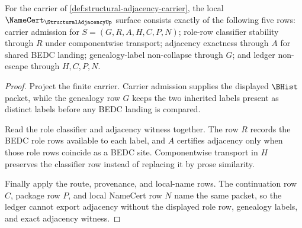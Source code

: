 \begin{theorem}
\label{thm:structural-adjacency-namecert-obligations}
For the carrier of \autoref{def:structural-adjacency-carrier}, the local $\NameCert_{\StructuralAdjacencyUp}$ surface consists exactly of the following five rows: carrier admission for $S=(G,R,A,H,C,P,N)$; role-row classifier stability through $R$ under componentwise transport; adjacency exactness through $A$ for shared BEDC landing; genealogy-label non-collapse through $G$; and ledger non-escape through $H,C,P,N$.
\end{theorem}
\begin{proof}
Project the finite carrier. Carrier admission supplies the displayed $\BHist$ packet, while the genealogy row $G$ keeps the two inherited labels present as distinct labels before any BEDC landing is compared.

Read the role classifier and adjacency witness together. The row $R$ records the BEDC role rows available to each label, and $A$ certifies adjacency only when those role rows coincide as a BEDC site. Componentwise transport in $H$ preserves the classifier row instead of replacing it by prose similarity.

Finally apply the route, provenance, and local-name rows. The continuation row $C$, package row $P$, and local NameCert row $N$ name the same packet, so the ledger cannot export adjacency without the displayed role row, genealogy labels, and exact adjacency witness.
\end{proof}

